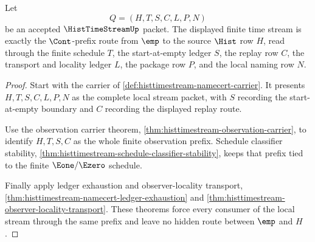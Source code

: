 \begin{theorem}
\label{thm:histtimestream-cont-prefix-exactness}
Let
$$
Q=(H,T,S,C,L,P,N)
$$
be an accepted $\HistTimeStreamUp$ packet. The displayed finite time stream is exactly the $\Cont$-prefix route from $\emp$ to the source $\Hist$ row $H$, read through the finite schedule $T$, the start-at-empty ledger $S$, the replay row $C$, the transport and locality ledger $L$, the package row $P$, and the local naming row $N$.
\end{theorem}
\begin{proof}
Start with the carrier of \autoref{def:histtimestream-namecert-carrier}. It presents $H,T,S,C,L,P,N$ as the complete local stream packet, with $S$ recording the start-at-empty boundary and $C$ recording the displayed replay route.

Use the observation carrier theorem, \autoref{thm:histtimestream-observation-carrier}, to identify $H,T,S,C$ as the whole finite observation prefix. Schedule classifier stability, \autoref{thm:histtimestream-schedule-classifier-stability}, keeps that prefix tied to the finite $\Eone/\Ezero$ schedule.

Finally apply ledger exhaustion and observer-locality transport, \autoref{thm:histtimestream-namecert-ledger-exhaustion} and \autoref{thm:histtimestream-observer-locality-transport}. These theorems force every consumer of the local stream through the same prefix and leave no hidden route between $\emp$ and $H$.
\end{proof}


